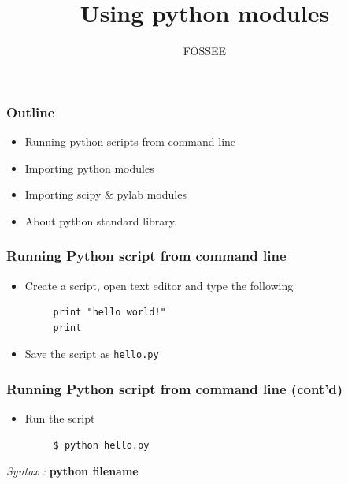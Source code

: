 \documentclass[presentation]{beamer}
\title{Using python modules}
\author{FOSSEE}
\date{}
\begin{document}
\maketitle









\begin{frame}
\frametitle{Outline}
\label{sec-1}

\begin{itemize}
\item Running python scripts from command line
\item Importing python modules
\item Importing scipy \& pylab modules
\item About python standard library.
\end{itemize}
\end{frame}
\begin{frame}[fragile]
\frametitle{Running Python script from command line}
\label{sec-2}

\begin{itemize}
\item Create a script, open text editor and type the following
\begin{verbatim}
     print "hello world!"
     print
\end{verbatim}

\item Save the script as \texttt{hello.py}
\end{itemize}
\end{frame}
\begin{frame}[fragile]
\frametitle{Running Python script from command line (cont'd)}
\label{sec-3}

\begin{itemize}
\item Run the script
\begin{verbatim}
     $ python hello.py
\end{verbatim}

\end{itemize}

  \emph{Syntax :} \textbf{python filename}
\end{frame}
\end{document}
